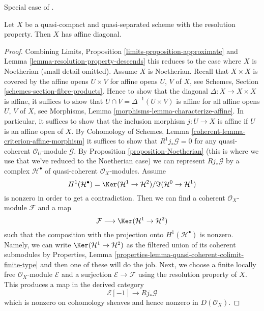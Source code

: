 \begin{lemma}
\label{lemma-resolution-property-affine-diagonal}
\begin{reference}
Special case of \cite[Proposition 1.3]{totaro_resolution}.
\end{reference}
Let $X$ be a quasi-compact and quasi-separated scheme with
the resolution property. Then $X$ has affine diagonal.
\end{lemma}

\begin{proof}
Combining Limits, Proposition \ref{limits-proposition-approximate}
and Lemma \ref{lemma-resolution-property-descends}
this reduces to the case where $X$ is Noetherian (small detail omitted).
Assume $X$ is Noetherian.
Recall that $X \times X$ is covered by the affine opens
$U \times V$ for affine opens $U$, $V$ of $X$, see
Schemes, Section \ref{schemes-section-fibre-products}.
Hence to show that the diagonal $\Delta : X \to X \times X$
is affine, it suffices to show that $U \cap V = \Delta^{-1}(U \times V)$
is affine for all affine opens $U$, $V$ of $X$, see
Morphisms, Lemma \ref{morphisms-lemma-characterize-affine}.
In particular, it suffices to show that the inclusion morphism
$j : U \to X$ is affine if $U$ is an affine open of $X$.
By Cohomology of Schemes, Lemma \ref{coherent-lemma-criterion-affine-morphism}
it suffices to show that $R^1j_*\mathcal{G} = 0$ for any
quasi-coherent $\mathcal{O}_U$-module $\mathcal{G}$.
By Proposition \ref{proposition-Noetherian} (this is where we use
that we've reduced to the Noetherian case)
we can represent $Rj_*\mathcal{G}$ by a complex
$\mathcal{H}^\bullet$ of quasi-coherent $\mathcal{O}_X$-modules.
Assume
$$
H^1(\mathcal{H}^\bullet) =
\Ker(\mathcal{H}^1 \to \mathcal{H}^2)/\Im(\mathcal{H}^0 \to \mathcal{H}^1)
$$
is nonzero in order to get a contradiction. Then we can find a coherent
$\mathcal{O}_X$-module $\mathcal{F}$ and a map
$$
\mathcal{F} \longrightarrow
\Ker(\mathcal{H}^1 \to \mathcal{H}^2)
$$
such that the composition with the projection onto $H^1(\mathcal{H}^\bullet)$
is nonzero. Namely, we can write $\Ker(\mathcal{H}^1 \to \mathcal{H}^2)$
as the filtered union of its coherent submodules by
Properties, Lemma \ref{properties-lemma-quasi-coherent-colimit-finite-type}
and then one of these will do the job.
Next, we choose a finite locally free $\mathcal{O}_X$-module
$\mathcal{E}$ and a surjection $\mathcal{E} \to \mathcal{F}$ using
the resolution property of $X$.
This produces a map in the derived category
$$
\mathcal{E}[-1] \longrightarrow Rj_*\mathcal{G}
$$
which is nonzero on cohomology sheaves and hence nonzero in $D(\mathcal{O}_X)$.

\end{proof}
